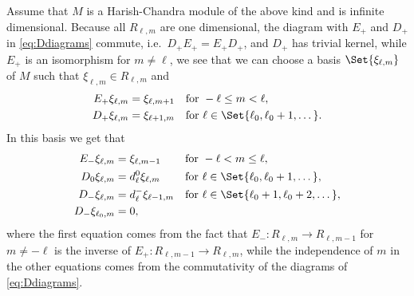 Assume that $M$ is a Harish-Chandra module of the above kind and is infinite dimensional. Because all $R_{\ell,m}$ are one dimensional, the diagram with $E_+$ and $D_+$ in \cref{eq:Ddiagrams} commute, i.e.\ $D_+E_+=E_+D_+$, and $D_+$ has trivial kernel, while $E_+$ is an isomorphism for $m\neq \ell$, we see that we can choose a basis $\Set{\xi_{\ell,m}}$ of $M$ such that $\xi_{\ell,m}\in R_{\ell,m}$ and
\begin{align*}
  E_+ \xi_{\ell,m} &= \xi_{\ell,m+1} && \mbox{for }-\ell\leq m<\ell,\\
  D_+ \xi_{\ell,m} &= \xi_{\ell+1,m} && \mbox{for }\ell\in\Set{\ell_0,\ell_0+1,\dotsc}.
\end{align*}
In this basis we get that
\begin{align}\label{eq:EandDnewbasis}
  \begin{aligned}
    E_- \xi_{\ell,m} &= \xi_{\ell,m-1} && \mbox{for }-\ell<m\leq \ell, \\
    D_0 \xi_{\ell,m} &= d_\ell^0 \xi_{\ell,m} && \mbox{for }\ell\in\Set{\ell_0,\ell_0+1,\dotsc},\\
    D_- \xi_{\ell,m} &= d_\ell^- \xi_{\ell-1,m} && \mbox{for }\ell\in\Set{\ell_0+1,\ell_0+2,\dotsc},\\
    D_- \xi_{\ell_0,m} &= 0,
  \end{aligned}
\end{align}
where the first equation comes from the fact that $E_-\colon R_{\ell,m}\to R_{\ell,m-1}$ for $m\neq -\ell$ is the inverse of $E_+\colon R_{\ell,m-1}\to R_{\ell,m}$, while the independence of $m$ in the other equations comes from the commutativity of the diagrams of \cref{eq:Ddiagrams}.

